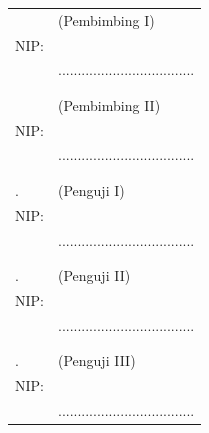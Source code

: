 \noindent
\begin{tabularx}{\textwidth}{X l}
  \advisor{}               & (Pembimbing I)                      \\
  NIP: \advisornip{}       &                                     \\
                           & ................................... \\
                           &                                     \\
                           &                                     \\
  \coadvisor{}             & (Pembimbing II)                     \\
  NIP: \coadvisornip{}     &                                     \\
                           & ................................... \\
                           &                                     \\
                           &                                     \\
  \examinerone{}.          & (Penguji I)                         \\
  NIP: \examineronenip{}   &                                     \\
                           & ................................... \\
                           &                                     \\
                           &                                     \\
  \examinertwo{}.          & (Penguji II)                        \\
  NIP: \examinertwonip{}   &                                     \\
                           & ................................... \\
                           &                                     \\
                           &                                     \\

  \examinerthree{}.        & (Penguji III)                       \\
  NIP: \examinerthreenip{} &                                     \\
                          & ................................... \\



\end{tabularx}
